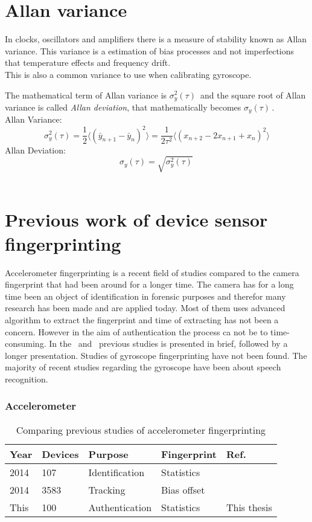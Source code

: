 \section{Allan variance}\label{char:allan}
In clocks, oscillators and amplifiers there is a measure of stability known as Allan variance. This variance is a estimation of bias processes and not imperfections that temperature effects and frequency drift.~\cite[]{allan}\\ 
This is also a common variance to use when calibrating gyroscope.~\cite[]{allanGyro1}~\cite[]{allanGyro2}

The mathematical term of Allan variance is $\sigma_y^2(\tau)\, $ and the square root of Allan variance is called \textit{Allan deviation}, that mathematically becomes $\sigma_y(\tau)\,$. \\
Allan Variance: \\
$$\sigma_y^2(\tau) = \frac{1}{2}\langle(\bar{y}_{n+1}-\bar{y}_n)^2\rangle = \frac{1}{2\tau^2}\langle(x_{n+2}-2x_{n+1}+x_n)^2\rangle$$
Allan Deviation:
$$\sigma_y(\tau) = \sqrt{\sigma_y^2(\tau)} \, $$
~\cite[]{allan}


\section{Previous work of device sensor fingerprinting}
Accelerometer fingerprinting is a recent field of studies compared to the camera fingerprint that had been around for a longer time. The camera has for a long time been an object of identification in forensic purposes and therefor many research has been made and are applied today. Most of them uses advanced algorithm to extract the fingerprint and time of extracting has not been a concern. However in the aim of authentication the process ca not be to time-consuming. In the~ and~ previous studies is presented in brief, followed by a longer presentation. Studies of gyroscope fingerprinting have not been found. The majority of recent studies regarding the gyroscope have been about speech recognition.  \cite[]{sensor:speechGyro} 



\begin{table}[H]
\subsubsection*{Accelerometer}
\centering
\begin{tabular}{| p{1cm} | p{1cm} | p{2.5cm} | p{1.8cm} | p{3.5cm} |}
  Year & Devices & Purpose & Fingerprint & Ref. \\ \hline
  2014 & 107 & Identification & Statistics &~\cite[]{sensor:accelPrint} \\
  2014 & 3583 & Tracking & Bias offset &~\cite[]{sensor:micSpeak} \\
  This & 100 & Authentication & Statistics & This thesis \\ \hline
\end{tabular} 
\caption{Comparing previous studies of accelerometer fingerprinting} \label{table:prevAcc}
\end{table}

